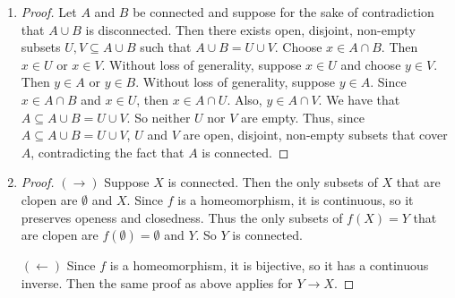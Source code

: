 \documentclass[11pt, letterpaper]{article}
\begin{document}
\thispagestyle{firststyle}


\begin{enumerate}
  \item \begin{proof}
    Let $A$ and $B$ be connected and suppose for the sake of contradiction that $A \cup B$ is disconnected. Then there exists open, disjoint, non-empty subsets $U, V \subseteq A \cup B$ such that $A \cup B = U \cup V$. Choose $x \in A \cap B$. Then $x \in U$ or $x \in V$. Without loss of generality, suppose $x \in U$ and choose $y \in V$. Then $y \in A$ or $y \in B$. Without loss of generality, suppose $y \in A$. Since $x \in A \cap B$ and $x \in U$, then $x \in A \cap U$. Also, $y \in A \cap V$. We have that $A \subseteq A \cup B = U \cup V$. So neither $U$ nor $V$ are empty. Thus, since $A \subseteq A \cup B = U \cup V$, $U$ and $V$ are open, disjoint, non-empty subsets that cover $A$, contradicting the fact that $A$ is connected.
  \end{proof}
  \item \begin{proof}
    $(\rightarrow)$ Suppose $X$ is connected. Then the only subsets of $X$ that are clopen are $\emptyset$ and $X$. Since $f$ is a homeomorphism, it is continuous, so it preserves openess and closedness. Thus the only subsets of $f(X) = Y$ that are clopen are $f(\emptyset) = \emptyset$ and $Y$. So $Y$ is connected.

    $(\leftarrow)$ Since $f$ is a homeomorphism, it is bijective, so it has a continuous inverse. Then the same proof as above applies for $Y \to X$.
  \end{proof}
\end{enumerate}
\end{document}

